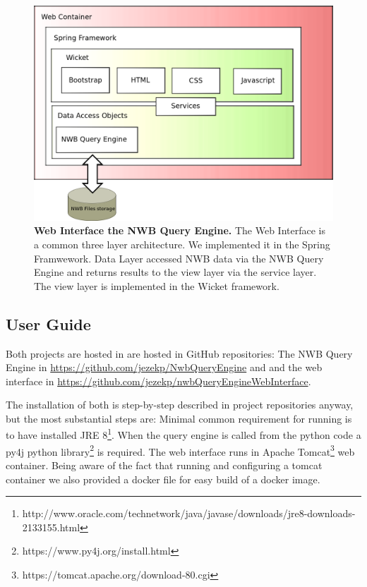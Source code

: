 \documentclass[utf8]{frontiersSCNS} %
\begin{document}
\begin{figure}
  \includegraphics[width=17cm]{web-interface}
\caption{\textbf{Web Interface the NWB Query Engine.} The Web Interface is a common three layer architecture. We implemented it in the Spring Framwework. Data Layer accessed NWB data via the NWB Query Engine and returns results to the view layer via the service layer. The view layer is implemented in the Wicket framework.}
\label{fig:architecture}
\end{figure}

\subsection{User Guide}

Both projects are hosted in are hosted in GitHub repositories: The NWB Query Engine in \url{https://github.com/jezekp/NwbQueryEngine} and and the web interface in \url{https://github.com/jezekp/nwbQueryEngineWebInterface}. 

The installation of both is step-by-step described in project repositories anyway, but the most substantial steps are:  Minimal common requirement for running is to have installed JRE 8\footnote{http://www.oracle.com/technetwork/java/javase/downloads/jre8-downloads-2133155.html}. When the query engine is called from the python code a py4j python library\footnote{https://www.py4j.org/install.html} is required. The web interface runs in Apache Tomcat\footnote{https://tomcat.apache.org/download-80.cgi} web container. Being aware of the fact that running and configuring a tomcat container we also provided a docker file for easy build of a docker image.
\end{document}
